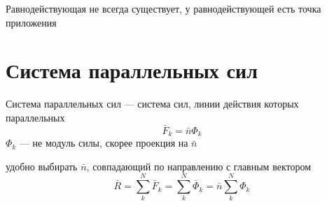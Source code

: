 \documentclass[crop=false]{standalone}
\begin{document}
Равнодействующая не всегда существует, у равнодействующей есть точка приложения

\section{Система параллельных сил}

\Def Система параллельных сил — система сил, линии действия которых параллельных
\[\bar F_k = \bar n \Phi_k\]
$\Phi_k$ — не модуль силы, скорее проекция на $\bar n$

удобно выбирать $\bar n$, совпадающий по направлению с главным вектором
\[\bar R = \sum_k^N \bar F_k = \sum_k^N \bar \Phi_k = \bar n \sum_k^N \Phi_k \]
\end{document}
